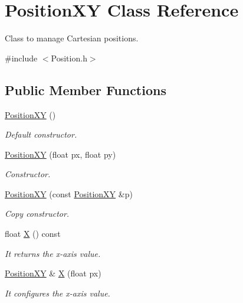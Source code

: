 \hypertarget{class_position_x_y}{\section{Position\+X\+Y Class Reference}
\label{class_position_x_y}
}


Class to manage Cartesian positions.  




{\ttfamily \#include $<$Position.\+h$>$}

\subsection*{Public Member Functions}
\begin{DoxyCompactItemize}
\item 
\hyperlink{class_position_x_y_a72c2bce8c3524d13a446e5f7bd00176b}{Position\+X\+Y} ()
\begin{DoxyCompactList}\small\item\em Default constructor. \end{DoxyCompactList}\item 
\hyperlink{class_position_x_y_aa45af7bc859ed16de19470c46e476456}{Position\+X\+Y} (float px, float py)
\begin{DoxyCompactList}\small\item\em Constructor. \end{DoxyCompactList}\item 
\hyperlink{class_position_x_y_a3f71105e1c27ad675a24062942866fd4}{Position\+X\+Y} (const \hyperlink{class_position_x_y}{Position\+X\+Y} \&p)
\begin{DoxyCompactList}\small\item\em Copy constructor. \end{DoxyCompactList}\item 
float \hyperlink{class_position_x_y_a02c862d5e5a643a6d774b1876a30cc5e}{X} () const 
\begin{DoxyCompactList}\small\item\em It returns the x-\/axis value. \end{DoxyCompactList}\item 
\hyperlink{class_position_x_y}{Position\+X\+Y} \& \hyperlink{class_position_x_y_aecca3ffac58837cd223add02a6145496}{X} (float px)
\begin{DoxyCompactList}\small\item\em It configures the x-\/axis value. \end{DoxyCompactList}\item 

\end{DoxyCompactItemize}
